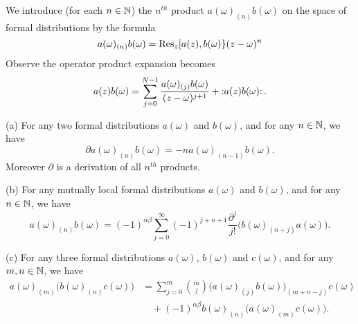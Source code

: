 \M\label{M:partialProduct}%
We introduce (for each $n\in\NN$) the $n^{th}$ product
$a(\omega)_{(n)}b(\omega)$ on the space of formal distributions by the
formula
\begin{equation}
a(\omega)_{(n)}b(\omega)=\Res[z]{\superb{a(z)}{b(\omega)}(z-\omega)^{n}}
\end{equation}
Observe the operator product expansion becomes
\begin{equation}\label{eq:OPEusingPartialProduct}
a(z)b(\omega)
=\sum^{N-1}_{j=0}\frac{a(\omega)_{(j)}b(\omega)}{(z-\omega)^{j+1}}
+\normOrd{a(z)b(\omega)}.
\end{equation}

(a) For any two formal distributions $a(\omega)$ and $b(\omega)$, and
for any $n\in\NN$, we have
\begin{equation}
\partial a(\omega)_{(n)}b(\omega)=-na(\omega)_{(n-1)}b(\omega).
\end{equation}
Moreover $\partial$ is a derivation of all $n^{th}$ products.

(b) For any mutually local formal distributions $a(\omega)$ and
$b(\omega)$, and for any $n\in\NN$, we have
\begin{equation}
a(\omega)_{(n)}b(\omega)=(-1)^{\alpha\beta}\sum^{\infty}_{j=0}(-1)^{j+n+1}\frac{\partial^{j}}{j!}\bigl(b(\omega)_{(n+j)}a(\omega)\bigr).
\end{equation}

(c) For any three formal distributions $a(\omega)$, $b(\omega)$ and
$c(\omega)$, and for any $m,n\in\NN$, we have
\begin{equation}
\begin{split}
a(\omega)_{(m)}\bigl(b(\omega)_{(n)}c(\omega)\bigr)
&=\sum^{m}_{j=0}\binom{m}{j}\bigl(a(\omega)_{(j)}b(\omega)\bigr)_{(m+n-j)}c(\omega)\\
&\quad+(-1)^{\alpha\beta}b(\omega)_{(n)}\bigl(a(\omega)_{(m)}c(\omega)\bigr).
\end{split}
\end{equation}

